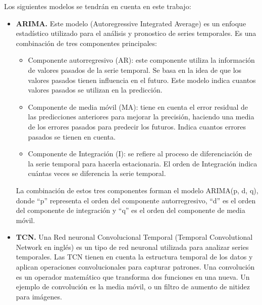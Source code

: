 Los siguientes modelos se tendrán en cuenta en este trabajo:
\begin{itemize}
    \item \textbf{ARIMA.} Este modelo (Autoregressive Integrated Average) \cite{hyndman2018forecasting} es un enfoque estadístico utilizado para 
        el análisis y pronostico de series temporales. Es una combinación de tres componentes principales:
        \begin{itemize}
            \item Componente autorregresivo (AR): este componente utiliza la información de valores pasados de la
                serie temporal. Se basa en la idea de que los valores pasados tienen influencia en el futuro. Este 
                modelo indica cuantos valores pasados se utilizan en la predicción.
            \item Componente de media móvil (MA): tiene en cuenta el error residual de las predicciones anteriores 
                para mejorar la precisión, haciendo una media de los errores pasados para predecir los futuros. 
                Indica cuantos errores pasados se tienen en cuenta.
            \item Componente de Integración (I): se refiere al proceso de diferenciación de la serie temporal para 
                hacerla estacionaria. El orden de Integración indica cuántas veces se diferencia la serie temporal.
        \end{itemize}
        La combinación de estos tres componentes forman el modelo ARIMA(p, d, q), donde ``p'' representa el orden 
        del componente autorregresivo, ``d'' es el orden del componente de integración y ``q'' es el orden del componente 
        de media móvil.
    \item \textbf{TCN.} Una Red neuronal Convolucional Temporal (Temporal Convolutional Network en inglés) \cite{DBLP:journals/corr/abs-1803-01271} es un tipo de 
        red neuronal utilizada para analizar series temporales. Las TCN tienen en cuenta la estructura temporal de los datos 
        y aplican operaciones convolucionales para capturar patrones. Una convolución \cite{hirschman2012convolution} es un operador matemático que transforma 
        dos funciones en una nueva. Un ejemplo de convolución es la media móvil, o un filtro de aumento de nitidez para imágenes.


\end{itemize}
